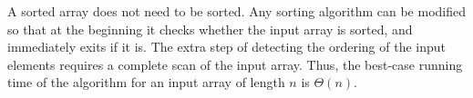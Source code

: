 A sorted array does not need to be sorted.
Any sorting algorithm can be modified so that at the beginning it checks whether the input array is sorted, and immediately exits if it is.
The extra step of detecting the ordering of the input elements requires a complete scan of the input array.
Thus, the best-case running time of the algorithm for an input array of length $n$ is $\Theta(n)$.
